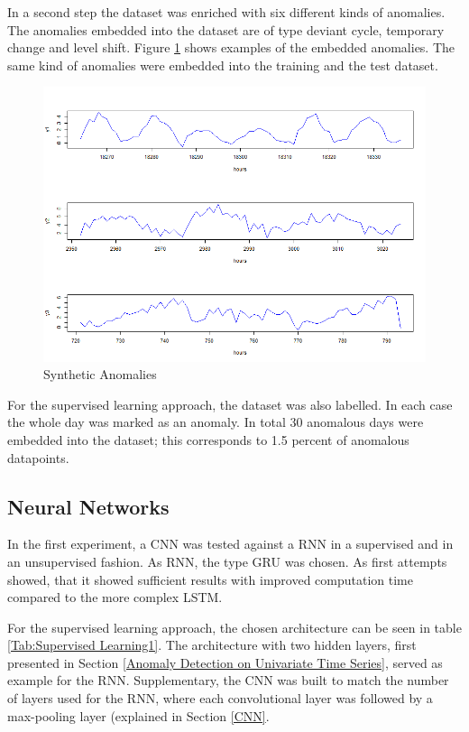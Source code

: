 In a second step the dataset was enriched with six different kinds of anomalies. The anomalies embedded into the dataset are of type deviant cycle, temporary change and level shift. Figure \ref{fig:anomalies} shows examples of the embedded anomalies. The same kind of anomalies were embedded into the training and the test dataset.

\begin{figure}[h]
	\centering
	\includegraphics[scale=0.7]{Figures/Anomalies}
	\decoRule
	\caption[Synthetic Anomalies]{Synthetic Anomalies \parencite{own}}
	\label{fig:anomalies}
\end{figure}

For the supervised learning approach, the dataset was also labelled. In each case the whole day was marked as an anomaly. In total 30 anomalous days were embedded into the dataset; this corresponds to 1.5 percent of anomalous datapoints.

\subsection{Neural Networks}
In the first experiment, a CNN was tested against a RNN in a supervised and in an unsupervised fashion. As RNN, the type GRU was chosen. As first attempts showed, that it showed sufficient results with improved computation time compared to the more complex LSTM. 

For the supervised learning approach, the chosen architecture can be seen in table \ref{Tab:Supervised Learning1}. The architecture with two hidden layers, first presented in Section \ref{Anomaly Detection on Univariate Time Series}, served as example for the RNN. Supplementary, the CNN was built to match the number of layers used for the RNN, where each convolutional layer was followed by a max-pooling layer (explained in Section \ref{CNN}.     

